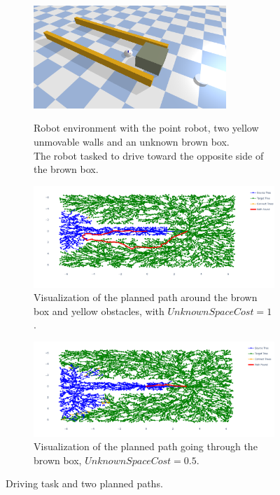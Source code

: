 \begin{figure}[H]
    \centering
    \begin{subfigure}{\textwidth}
    \centering
  \includegraphics[width=0.8\textwidth]{figures/proposed_method/push_or_drive}
    \caption{Robot environment with the point robot, two yellow unmovable walls and an unknown brown box.\\The robot tasked to drive toward the opposite side of the brown box.}\label{subfig:push_or_drive_env}
    \end{subfigure}

    \begin{subfigure}{1.11\textwidth}
    \centering
    \includegraphics[width=\textwidth]{figures/required_background/mp/mp_high_fixed_cost}
    \caption{Visualization of the planned path around the brown box and yellow obstacles, with $\mathit{UnknownSpaceCost} = 1$.}
    \end{subfigure}

    \begin{subfigure}{1.11\textwidth}
    \centering
    \includegraphics[width=\textwidth]{figures/required_background/mp/mp_low_fixed_cost}
    \caption{Visualization of the planned path going through the brown box, $\mathit{UnknownSpaceCost} = 0.5$.}
    \end{subfigure}
    \caption{Driving task and two planned paths.}%
    \label{fig:mp_push_or_drive}
\end{figure}

